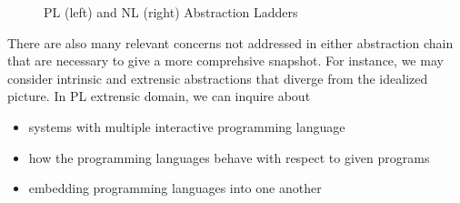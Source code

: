 \begin{figure}
\centering
{}
\hspace{1cm}
\caption{PL (left) and NL (right) Abstraction Ladders} \label{fig:M1}
\end{figure}


There are also many relevant concerns not addressed in either abstraction chain
that are necessary to give a more comprehsive snapshot. For instance, we may
consider intrinsic and extrensic abstractions that diverge from the idealized
picture. In PL extrensic domain, we can inquire about 

\begin{itemize}

\item systems with multiple interactive programming language 
\item how the programming languages behave with respect to given programs
\item embedding programming languages into one another

\end{itemize}

